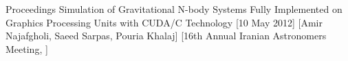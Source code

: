 \begin{cvsection}{Proceedings}
    \cvitem
    {Simulation of Gravitational N-body Systems Fully Implemented on Graphics Processing Units with CUDA/C Technology}
    [10 May 2012]
    [Amir Najafgholi, Saeed Sarpas, Pouria Khalaj]
    [16th Annual Iranian Astronomers Meeting, \IASBS]
\end{cvsection}